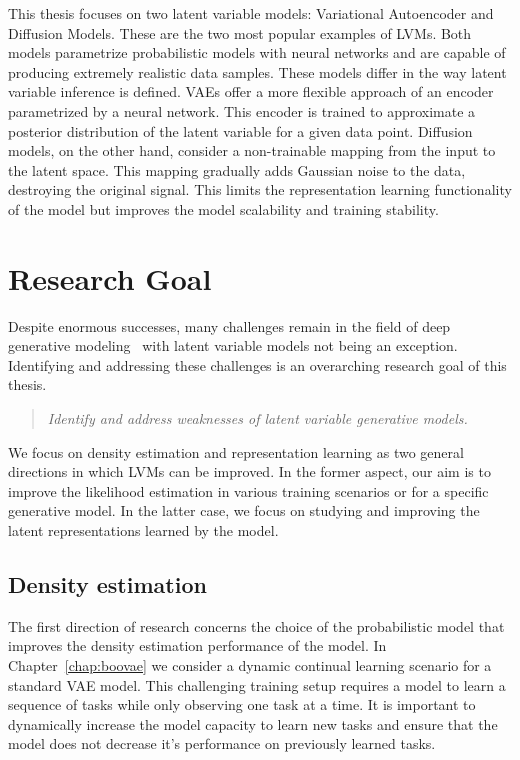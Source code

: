 This thesis focuses on two latent variable models: Variational Autoencoder and Diffusion Models. These are the two most popular examples of LVMs. Both models parametrize probabilistic models with neural networks and are capable of producing extremely realistic data samples. 
These models differ in the way latent variable inference is defined. 
VAEs offer a more flexible approach of an encoder parametrized by a neural network. 
This encoder is trained to approximate a posterior distribution of the latent variable for a given data point.
Diffusion models, on the other hand, consider a non-trainable mapping from the input to the latent space. This mapping gradually adds Gaussian noise to the data, destroying the original signal. This limits the representation learning functionality of the model but improves the model scalability and training stability. 


\section{Research Goal}
Despite enormous successes, many challenges remain in the field of deep generative modeling~\citep{manduchi2024challenges} with latent variable models not being an exception. 
Identifying and addressing these challenges is an overarching research goal of this thesis.

\begin{quote}
\normalsize\itshape \noindent 
Identify and address weaknesses of latent variable generative models.
\end{quote}

We focus on density estimation and representation learning as two general directions in which LVMs can be improved. 
 In the former aspect, our aim is to improve the likelihood estimation in various training scenarios or for a specific generative model. In the latter case, we focus on studying and improving the latent representations learned by the model. 

\subsection{Density estimation}
The first direction of research concerns the choice of the probabilistic model that improves the density estimation performance of the model. 
In Chapter~\ref{chap:boovae} we consider a dynamic continual learning scenario for a standard VAE model. This challenging training setup requires a model to learn a sequence of tasks while only observing one task at a time. It is important to dynamically increase the model capacity to learn new tasks and ensure that the model does not decrease it's performance on previously learned tasks.

